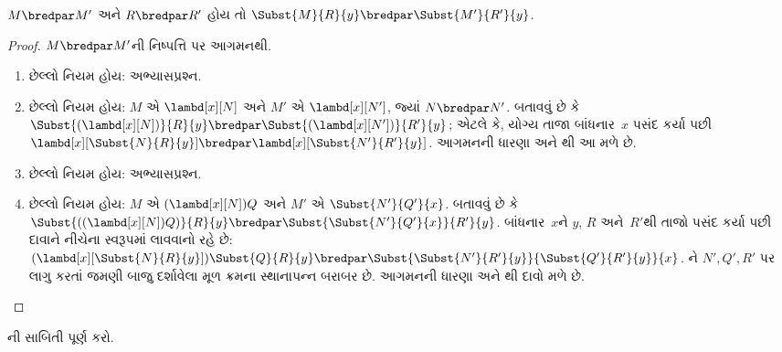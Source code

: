\begin{lem}
  $M \bredpar M'$ અને $R \bredpar R'$ હોય તો
  $\Subst{M}{R}{y} \bredpar
  \Subst{M'}{R'}{y}$.
\end{lem}

\begin{proof}
  $M \bredpar M'$ની નિષ્પત્તિ પર આગમનથી.
  \begin{enumerate}
    \item છેલ્લો નિયમ  હોય: અભ્યાસપ્રશ્ન.
    \item છેલ્લો નિયમ  હોય:
      $M$ એ $\lambd[x][N]$ અને $M'$ એ $\lambd[x][N']$,
      જ્યાં $N \bredpar N'$. બતાવવું છે કે
      $\Subst{(\lambd[x][N])}{R}{y} \bredpar
      \Subst{(\lambd[x][N'])}{R'}{y}$; એટલે કે,
      યોગ્ય તાજા બાંધનાર~$x$ પસંદ કર્યા પછી
      $\lambd[x][\Subst{N}{R}{y}] \bredpar
      \lambd[x][\Subst{N'}{R'}{y}]$.
      આગમનની ધારણા અને થી આ મળે છે.
    \item છેલ્લો નિયમ  હોય: અભ્યાસપ્રશ્ન.
    \item છેલ્લો નિયમ  હોય:
      $M$ એ $(\lambd[x][N])Q$ અને
      $M'$ એ $\Subst{N'}{Q'}{x}$. બતાવવું છે કે
      $\Subst{((\lambd[x][N])Q)}{R}{y} \bredpar
      \Subst{\Subst{N'}{Q'}{x}}{R'}{y}$.
      બાંધનાર~$x$ને $y$, $R$ અને~$R'$થી તાજો
      પસંદ કર્યા પછી દાવાને નીચેના સ્વરૂપમાં લાવવાનો રહે છે:
      $(\lambd[x][\Subst{N}{R}{y}])\Subst{Q}{R}{y} \bredpar
      \Subst{\Subst{N'}{R'}{y}}{\Subst{Q'}{R'}{y}}{x}$.
      ને $N',Q',R'$ પર લાગુ કરતાં
      જમણી બાજુ દર્શાવેલા મૂળ ક્રમના સ્થાનાપન્ન બરાબર છે.
      આગમનની ધારણા અને થી દાવો મળે છે.
  \end{enumerate}
\end{proof}

\begin{prob}
  ની સાબિતી પૂર્ણ કરો.
\end{prob}

